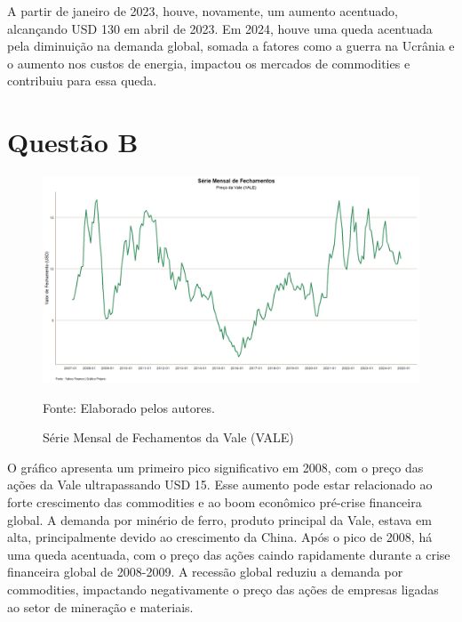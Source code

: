 \documentclass[a4paper,12pt]{article}[abntex2]
\begin{document}
A partir de janeiro de 2023, houve, novamente, um aumento acentuado, alcançando USD 130 em abril de 2023. Em 2024, houve uma queda acentuada pela diminuição na demanda global, somada a fatores como a guerra na Ucrânia e o aumento nos custos de energia, impactou os mercados de commodities e contribuiu para essa queda. 

\section*{\textbf{Questão B}}

\begin{figure}[H]
    \centering
    \caption{Série Mensal de Fechamentos da Vale (VALE)} 
    \includegraphics[width=1.0\textwidth]{APS 2/i1qB.png}
    \label{fig:i1qB}
    
    \footnotesize{Fonte: Elaborado pelos autores.}
    \end{figure}
O gráfico apresenta um primeiro pico significativo em 2008, com o preço das ações da Vale ultrapassando USD 15. Esse aumento pode estar relacionado ao forte crescimento das commodities e ao boom econômico pré-crise financeira global. A demanda por minério de ferro, produto principal da Vale, estava em alta, principalmente devido ao crescimento da China. Após o pico de 2008, há uma queda acentuada, com o preço das ações caindo rapidamente durante a crise financeira global de 2008-2009. A recessão global reduziu a demanda por commodities, impactando negativamente o preço das ações de empresas ligadas ao setor de mineração e materiais.
\end{document}
